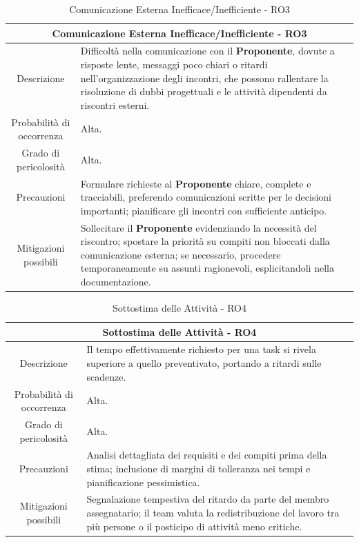 \documentclass[12pt, a4paper]{article}
\begin{document}
\begin{table}[H]
    \centering
    \renewcommand{\arraystretch}{1.3}
    \begin{tabularx}{\textwidth}{|c|X|}
        \hline
        \multicolumn{2}{|c|}{\textbf{Comunicazione Esterna Inefficace/Inefficiente - RO3}} \\ \hline
        Descrizione & 
        Difficoltà nella comunicazione con il \textbf{Proponente}, dovute a risposte lente, messaggi poco chiari o ritardi nell'organizzazione degli incontri, che possono rallentare la risoluzione di dubbi progettuali e le attività dipendenti da riscontri esterni.
\\ \hline
        Probabilità di occorrenza & Alta.
\\ \hline
        Grado di pericolosità & Alta.
\\ \hline
        Precauzioni &
        Formulare richieste al \textbf{Proponente} chiare, complete e tracciabili, preferendo comunicazioni scritte per le decisioni importanti; pianificare gli incontri con sufficiente anticipo.
\\ \hline
        Mitigazioni possibili & 
        Sollecitare il \textbf{Proponente} evidenziando la necessità del riscontro; spostare la priorità su compiti non bloccati dalla comunicazione esterna; se necessario, procedere temporaneamente su assunti ragionevoli, esplicitandoli nella documentazione.
\\ \hline
        
    \end{tabularx}
    \caption{Comunicazione Esterna Inefficace/Inefficiente - RO3}
\end{table}

\begin{table}[H]
    \centering
    \renewcommand{\arraystretch}{1.3}
    \begin{tabularx}{\textwidth}{|c|X|}
        \hline
        \multicolumn{2}{|c|}{\textbf{Sottostima delle Attività - RO4}} \\ \hline
        Descrizione &
        Il tempo effettivamente richiesto per una task si rivela superiore a quello preventivato, portando a ritardi sulle scadenze.
        \\ \hline
        Probabilità di occorrenza & Alta.
        \\ \hline
        Grado di pericolosità & Alta.
        \\ \hline
        Precauzioni &
        Analisi dettagliata dei requisiti e dei compiti prima della stima;
        inclusione di margini di tolleranza nei tempi e pianificazione pessimistica.
        \\ \hline
        Mitigazioni possibili & 
        Segnalazione tempestiva del ritardo da parte del membro assegnatario;
        il team valuta la redistribuzione del lavoro tra più persone o il posticipo di attività meno critiche.\\ \hline
    \end{tabularx}
    \caption{Sottostima delle Attività - RO4}
\end{table}
\end{document}
